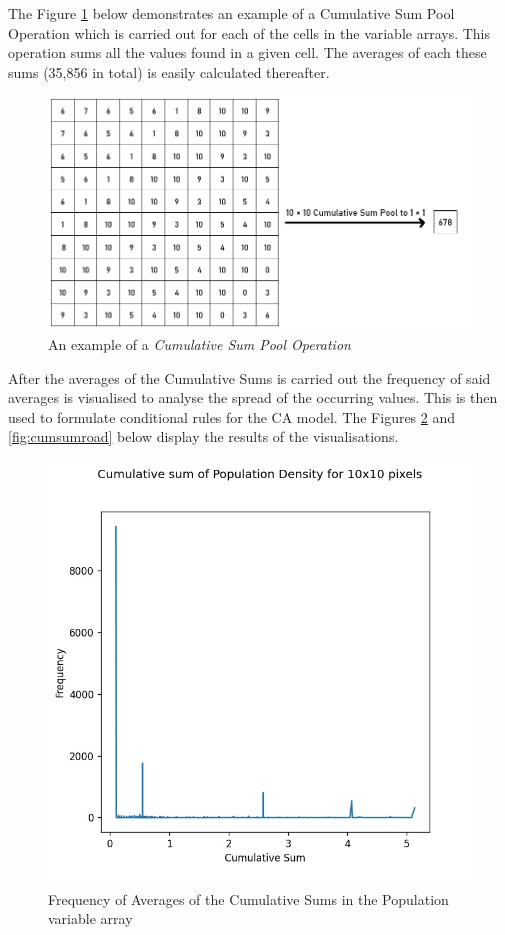 The Figure \ref{fig:cumsumpool} below demonstrates an example of a Cumulative Sum Pool Operation which is carried out for each of the cells in the variable arrays. This operation sums all the values found in a given cell. The averages of each these sums (35,856 in total) is easily calculated thereafter.
\begin{figure}
\centering
\includegraphics[scale=0.7]{Figures/Chapter3/sumpool}
\caption{An example of a \textit{Cumulative Sum Pool Operation}}
\label{fig:cumsumpool}
\end{figure}
After the averages of the Cumulative Sums is carried out the frequency of said averages is visualised to analyse the spread of the occurring values. This is then used to formulate conditional rules for the CA model. The Figures \ref{fig:cumsumpop} and \ref{fig:cumsumroad} below display the results of the visualisations.
\begin{figure}[H]
\centering
\includegraphics[scale=0.7]{Figures/Chapter3/populationSum}
\caption{Frequency of Averages of the Cumulative Sums in the Population variable array}
\label{fig:cumsumpop}
\end{figure}
